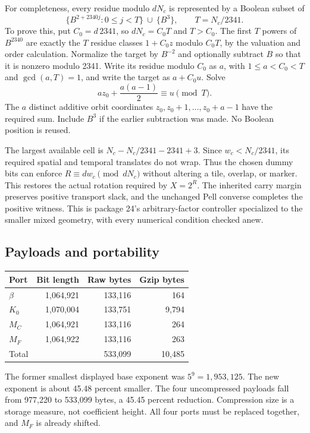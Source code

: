 \documentclass[11pt]{article}
\theoremstyle{definition}\newtheorem{definition}[theorem]{Definition}
\begin{document}
For completeness, every residue modulo $dN_c$ is represented by a Boolean subset of
\[
 \{B^{2+2340j}:0\le j<T\}\ \cup\ \{B^3\},\qquad
 T=N_c/2341.
\]
To prove this, put $C_0=d\,2341$, so $dN_c=C_0T$ and $T>C_0$. The first $T$ powers of $B^{2340}$ are exactly the $T$ residue classes $1+C_0z$ modulo $C_0T$, by the valuation and order calculation. Normalize the target by $B^{-2}$ and optionally subtract $B$ so that it is nonzero modulo 2341. Write its residue modulo $C_0$ as $a$, with $1\le a<C_0<T$ and $\gcd(a,T)=1$, and write the target as $a+C_0u$. Solve
\[
 az_0+\frac{a(a-1)}2\equiv u\pmod T.
\]
The $a$ distinct additive orbit coordinates $z_0,z_0+1,\ldots,z_0+a-1$ have the required sum. Include $B^3$ if the earlier subtraction was made. No Boolean position is reused.

The largest available cell is $N_c-N_c/2341-2341+3$. Since $w_c<N_c/2341$, its required spatial and temporal translates do not wrap. Thus the chosen dummy bits can enforce
$R\equiv dw_c\pmod{dN_c}$ without altering a tile, overlap, or marker. This restores the actual rotation required by $X=2^R$. The inherited carry margin preserves positive transport slack, and the unchanged Pell converse completes the positive witness. This is package 24's arbitrary-factor controller specialized to the smaller mixed geometry, with every numerical condition checked anew.

\subsection{Payloads and portability}
\begin{center}
\begin{tabular}{lrrr}
\toprule
Port & Bit length & Raw bytes & Gzip bytes\\
\midrule
$\beta$&1,064,921&133,116&164\\
$K_0$&1,070,004&133,751&9,794\\
$M_C$&1,064,921&133,116&264\\
$M_F$&1,064,922&133,116&263\\
\midrule
Total&&533,099&10,485\\
\bottomrule
\end{tabular}
\end{center}
The former smallest displayed base exponent was $5^9=1,953,125$. The new exponent is about 45.48 percent smaller. The four uncompressed payloads fall from 977,220 to 533,099 bytes, a 45.45 percent reduction. Compression size is a storage measure, not coefficient height. All four ports must be replaced together, and $M_F$ is already shifted.
\end{document}
